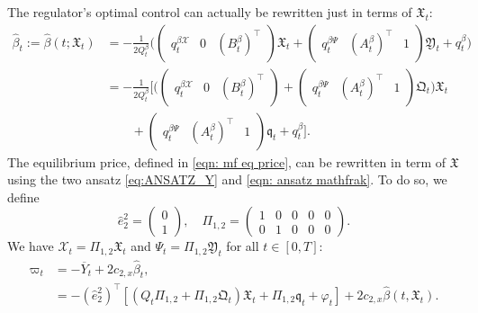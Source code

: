 \documentclass[11pt,twoside]{amsart}
\theoremstyle{definition}
\numberwithin{equation}{section}
\newcommand{\w}{\varpi}
\renewcommand{\bar}{\overline}
\renewcommand{\hat}{\widehat}
\begin{document}
The regulator's optimal control can actually be rewritten just in terms of $\mathfrak{X}_t$:
\begin{align*}
    \hat\beta_t 
    := \hat\beta(t;\mathfrak{X}_t)&= -
    \frac{1}{2Q^\beta_t} \bigg( 
    \begin{pmatrix}
        q^{\beta\mathcal{X}}_t & 0 & (B^\beta_t)^\top
    \end{pmatrix}
    \mathfrak{X}_t + 
    \begin{pmatrix}
        q^{\beta\Psi}_t & (A^\beta_t)^\top & 1
    \end{pmatrix}
    \mathfrak{Y}_t + q^\beta_t\bigg)\\
    &= -
    \frac{1}{2Q^\beta_t} \bigg[\bigg( 
    \begin{pmatrix}
        q^{\beta\mathcal{X}}_t & 0 & (B^\beta_t)^\top
    \end{pmatrix}
    + 
    \begin{pmatrix}
        q^{\beta\Psi}_t & (A^\beta_t)^\top & 1
    \end{pmatrix}
    \mathfrak{Q}_t\bigg)\mathfrak{X}_t \\
    &\qquad +
    \begin{pmatrix}
        q^{\beta\Psi}_t & (A^\beta_t)^\top & 1
    \end{pmatrix}
    \mathfrak{q}_t+ q^\beta_t\bigg].
\end{align*}
The equilibrium price, defined in \eqref{eqn: mf eq price}, can be rewritten in term of $\mathfrak{X}$ using the two ansatz \eqref{eq:ANSATZ_Y} and \eqref{eqn: ansatz mathfrak}. To do so, we define 
\begin{equation*}
    \hat{e}^2_2 = 
    \begin{pmatrix}
        0\\
        1
    \end{pmatrix},\quad
    \Pi_{1,2} = 
    \begin{pmatrix}
        1& 0& 0& 0& 0\\
        0& 1& 0& 0& 0
    \end{pmatrix}.
\end{equation*}
We have $\mathcal{X}_t = \Pi_{1,2} \mathfrak{X}_t$ and $\Psi_t = \Pi_{1,2} \mathfrak{Y}_t$ for all $t\in[0,T]$:
\begin{align*}
    \w_t 
    &= -\bar{Y}_t + 2c_{2,x}\hat\beta_t,\\
    &= -(\hat{e}^2_2)^\top [(Q_t\Pi_{1,2} + \Pi_{1,2}\mathfrak{Q}_t)\mathfrak{X}_t + \Pi_{1,2}\mathfrak{q}_t + \varphi_t]  + 2c_{2,x}\hat\beta(t, \mathfrak{X}_t).
\end{align*}
\end{document}
